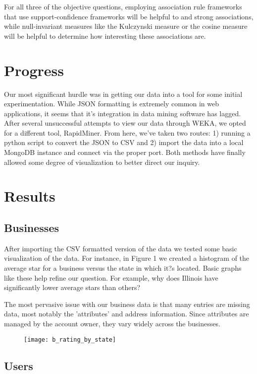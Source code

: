 \quad For all three of the objective questions, employing association rule frameworks that use support-confidence frameworks will be helpful to and strong associations, while null-invariant measures like the Kulczynski measure or the cosine measure will be helpful to determine how interesting these associations are.

\section{Progress}

\quad Our most significant hurdle was in getting our data into a tool for some initial experimentation. While JSON formatting is extremely common in web applications, it seems that it's integration in data mining software has lagged. After several unsuccessful attempts to view our data through WEKA, we opted for a different tool, RapidMiner. From here, we've taken two routes: 1) running a python script to convert the JSON to CSV and 2) import the data into a local MongoDB instance and connect via the proper port. Both methods have finally allowed some degree of visualization to better direct our inquiry.

\section{Results}

\subsection{Businesses}

\quad After importing the CSV formatted version of the data we tested some basic visualization of the data. For instance, in Figure 1 we created a histogram of the average star for a business versus the state in which it?s located. Basic graphs like these help refine our question. For example, why does Illinois have significantly lower average stars than others? 

\quad The most pervasive issue with our business data is that many entries are missing data, most notably the 'attributes' and address information. Since attributes are managed by the account owner, they vary widely across the businesses.

\begin{figure}
\texttt{[image: b\_rating\_by\_state]}
\end{figure}

\subsection{Users}

